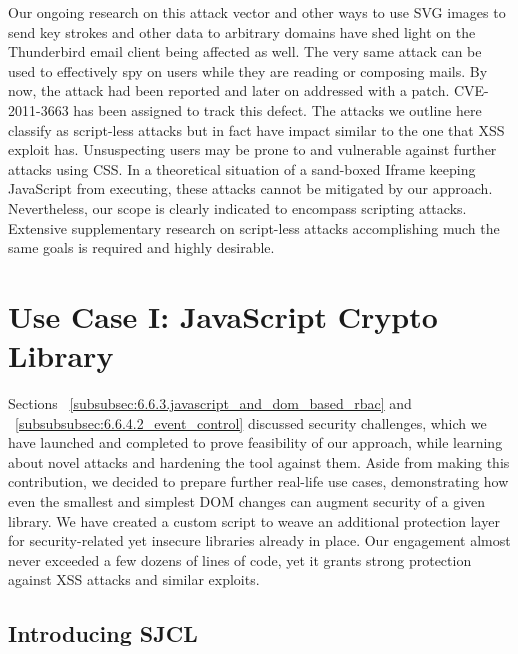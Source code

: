     Our ongoing research on this attack vector and other ways to use SVG images to send key strokes and other data to arbitrary domains have shed light on the Thunderbird email client being affected as well. The very same attack can be used to effectively spy on users while they are reading or composing mails. By now, the attack had been reported and later on addressed with a patch. CVE-2011-3663 has been assigned to track this defect. The attacks we outline here classify as script-less attacks but in fact have impact similar to the one that XSS exploit has. Unsuspecting users may be prone to and vulnerable against further attacks using CSS. In a theoretical situation of a sand-boxed Iframe keeping JavaScript from executing, these attacks cannot be mitigated by our approach. Nevertheless, our scope is clearly indicated to encompass scripting attacks. Extensive supplementary research on script-less attacks accomplishing much the same goals is required and highly desirable.

  \section{Use Case I: JavaScript Crypto Library}
    \label{subsubsec:6.6.6.real_life_use_cases}

      Sections ~\ref{subsubsec:6.6.3.javascript_and_dom_based_rbac} and ~\ref{subsubsubsec:6.6.4.2_event_control} discussed security challenges, which we have launched and completed to prove feasibility of our approach, while learning about novel attacks and hardening the tool against them. Aside from making this contribution, we decided to prepare further real-life use cases, demonstrating how even the smallest and simplest DOM changes can augment security of a given library. We have created a custom script to weave an additional protection layer for security-related yet insecure libraries already in place. Our engagement almost never exceeded a few dozens of lines of code, yet it grants strong protection against XSS attacks and similar exploits. 

      \subsection{Introducing SJCL}
      \label{subsubsubsec:6.6.6.1.javascript_crypto_library}

